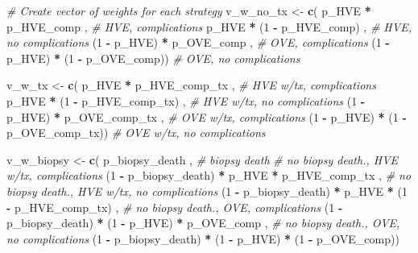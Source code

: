 \documentclass[
]{article}
\newenvironment{Shaded}{\begin{snugshade}}{\end{snugshade}}
\newcommand{\CommentTok}[1]{\textcolor[rgb]{0.56,0.35,0.01}{\textit{#1}}}
\newcommand{\DecValTok}[1]{\textcolor[rgb]{0.00,0.00,0.81}{#1}}
\newcommand{\FunctionTok}[1]{\textcolor[rgb]{0.13,0.29,0.53}{\textbf{#1}}}
\newcommand{\NormalTok}[1]{#1}
\newcommand{\OtherTok}[1]{\textcolor[rgb]{0.56,0.35,0.01}{#1}}
\newcommand{\SpecialCharTok}[1]{\textcolor[rgb]{0.81,0.36,0.00}{\textbf{#1}}}
\begin{document}
\begin{Shaded}
\begin{Highlighting}[]
\CommentTok{\# Create vector of weights for each strategy }
\NormalTok{v\_w\_no\_tx  }\OtherTok{\textless{}{-}} \FunctionTok{c}\NormalTok{(    p\_HVE  }\SpecialCharTok{*}\NormalTok{      p\_HVE\_comp     ,  }\CommentTok{\# HVE, complications}
\NormalTok{                    p\_HVE  }\SpecialCharTok{*}\NormalTok{ (}\DecValTok{1} \SpecialCharTok{{-}}\NormalTok{ p\_HVE\_comp)    ,  }\CommentTok{\# HVE, no complications}
\NormalTok{               (}\DecValTok{1} \SpecialCharTok{{-}}\NormalTok{ p\_HVE) }\SpecialCharTok{*}\NormalTok{      p\_OVE\_comp     ,  }\CommentTok{\# OVE, complications}
\NormalTok{               (}\DecValTok{1} \SpecialCharTok{{-}}\NormalTok{ p\_HVE) }\SpecialCharTok{*}\NormalTok{ (}\DecValTok{1} \SpecialCharTok{{-}}\NormalTok{ p\_OVE\_comp))      }\CommentTok{\# OVE, no complications}
  
\NormalTok{v\_w\_tx     }\OtherTok{\textless{}{-}} \FunctionTok{c}\NormalTok{(    p\_HVE  }\SpecialCharTok{*}\NormalTok{      p\_HVE\_comp\_tx  ,  }\CommentTok{\# HVE w/tx, complications}
\NormalTok{                    p\_HVE  }\SpecialCharTok{*}\NormalTok{ (}\DecValTok{1} \SpecialCharTok{{-}}\NormalTok{ p\_HVE\_comp\_tx) ,  }\CommentTok{\# HVE w/tx, no complications}
\NormalTok{               (}\DecValTok{1} \SpecialCharTok{{-}}\NormalTok{ p\_HVE) }\SpecialCharTok{*}\NormalTok{      p\_OVE\_comp\_tx  ,  }\CommentTok{\# OVE w/tx, complications}
\NormalTok{               (}\DecValTok{1} \SpecialCharTok{{-}}\NormalTok{ p\_HVE) }\SpecialCharTok{*}\NormalTok{ (}\DecValTok{1} \SpecialCharTok{{-}}\NormalTok{ p\_OVE\_comp\_tx))   }\CommentTok{\# OVE w/tx, no complications}
  
\NormalTok{v\_w\_biopsy }\OtherTok{\textless{}{-}} \FunctionTok{c}\NormalTok{(    p\_biopsy\_death                   ,  }\CommentTok{\# biopsy death}
               \CommentTok{\# no biopsy death.,   HVE w/tx,        complications}
\NormalTok{               (}\DecValTok{1} \SpecialCharTok{{-}}\NormalTok{ p\_biopsy\_death)   }\SpecialCharTok{*}\NormalTok{      p\_HVE  }\SpecialCharTok{*}\NormalTok{    p\_HVE\_comp\_tx  ,  }
               \CommentTok{\# no biopsy death.,   HVE w/tx,     no complications}
\NormalTok{               (}\DecValTok{1} \SpecialCharTok{{-}}\NormalTok{ p\_biopsy\_death)   }\SpecialCharTok{*}\NormalTok{      p\_HVE  }\SpecialCharTok{*}\NormalTok{ (}\DecValTok{1} \SpecialCharTok{{-}}\NormalTok{ p\_HVE\_comp\_tx) ,  }
               \CommentTok{\# no biopsy death.,        OVE,        complications}
\NormalTok{               (}\DecValTok{1} \SpecialCharTok{{-}}\NormalTok{ p\_biopsy\_death)   }\SpecialCharTok{*}\NormalTok{ (}\DecValTok{1} \SpecialCharTok{{-}}\NormalTok{ p\_HVE) }\SpecialCharTok{*}\NormalTok{      p\_OVE\_comp   ,  }
               \CommentTok{\# no biopsy death.,        OVE,     no complications}
\NormalTok{               (}\DecValTok{1} \SpecialCharTok{{-}}\NormalTok{ p\_biopsy\_death)   }\SpecialCharTok{*}\NormalTok{ (}\DecValTok{1} \SpecialCharTok{{-}}\NormalTok{ p\_HVE) }\SpecialCharTok{*}\NormalTok{ (}\DecValTok{1} \SpecialCharTok{{-}}\NormalTok{ p\_OVE\_comp))      }
\end{Highlighting}
\end{Shaded}
\end{document}
